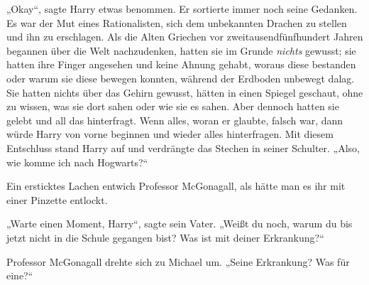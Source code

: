 „Okay“, sagte Harry etwas benommen. Er sortierte immer noch seine Gedanken. Es war der Mut eines Rationalisten, sich dem unbekannten Drachen zu stellen und ihn zu erschlagen. Als die Alten Griechen vor zweitausendfünfhundert Jahren begannen über die Welt nachzudenken, hatten sie im Grunde \emph{nichts} gewusst; sie hatten ihre Finger angesehen und keine Ahnung gehabt, woraus diese bestanden oder warum sie diese bewegen konnten, während der Erdboden unbewegt dalag. Sie hatten nichts über das Gehirn gewusst, hätten in einen Spiegel geschaut, ohne zu wissen, was sie dort sahen oder wie sie es sahen. Aber dennoch hatten sie gelebt und all das hinterfragt. Wenn alles, woran er glaubte, falsch war, dann würde Harry von vorne beginnen und wieder alles hinterfragen. Mit diesem Entschluss stand Harry auf und verdrängte das Stechen in seiner Schulter.
„Also, wie komme ich nach Hogwarts?“

Ein ersticktes Lachen entwich Professor McGonagall, als hätte man es ihr mit einer Pinzette entlockt.

„Warte einen Moment, Harry“, sagte sein Vater.
„Weißt du noch, warum du bis jetzt nicht in die Schule gegangen bist? Was ist mit deiner Erkrankung?“

Professor McGonagall drehte sich zu Michael um.
„Seine Erkrankung? Was für eine?“

